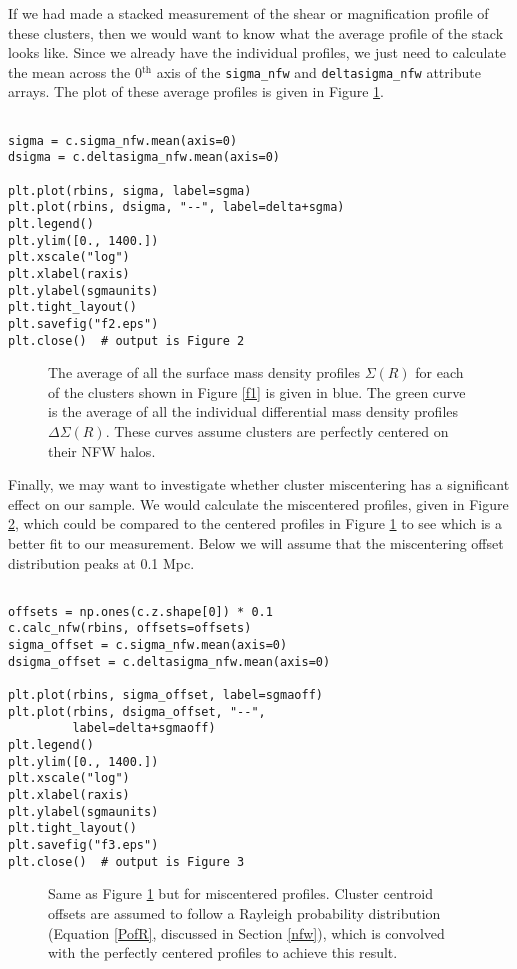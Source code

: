 \documentclass[twocolumn]{aastex6}
\newcommand{\code}{\lstinline[style=codeintext]}
\begin{document}
If we had made a stacked measurement of the shear or magnification profile of these clusters, then we would want to know what the average profile of the stack looks like. Since we already have the individual profiles, we just need to calculate the mean across the 0$^\mathrm{th}$ axis of the \code{sigma_nfw} and \code{deltasigma_nfw} attribute arrays. The plot of these average profiles is given in Figure \ref{f2}.

\begin{lstlisting}

sigma = c.sigma_nfw.mean(axis=0)
dsigma = c.deltasigma_nfw.mean(axis=0)

plt.plot(rbins, sigma, label=sgma)
plt.plot(rbins, dsigma, "--", label=delta+sgma)
plt.legend()
plt.ylim([0., 1400.])
plt.xscale("log")
plt.xlabel(raxis)
plt.ylabel(sgmaunits)
plt.tight_layout()
plt.savefig("f2.eps")
plt.close()  # output is Figure 2

\end{lstlisting}

\begin{figure}
\caption{The average of all the surface mass density profiles $\Sigma(R)$ for each of the clusters shown in Figure \ref{f1} is given in blue. The green curve is the average of all the individual differential mass density profiles $\Delta\Sigma(R)$. These curves assume clusters are perfectly centered on their NFW halos.}
\label{f2}
\end{figure}

Finally, we may want to investigate whether cluster miscentering has a significant effect on our sample. We would calculate the miscentered profiles, given in Figure \ref{f3}, which could be compared to the centered profiles in Figure \ref{f2} to see which is a better fit to our measurement. Below we will assume that the miscentering offset distribution peaks at 0.1 Mpc.

\begin{lstlisting}

offsets = np.ones(c.z.shape[0]) * 0.1
c.calc_nfw(rbins, offsets=offsets)
sigma_offset = c.sigma_nfw.mean(axis=0)
dsigma_offset = c.deltasigma_nfw.mean(axis=0)

plt.plot(rbins, sigma_offset, label=sgmaoff)
plt.plot(rbins, dsigma_offset, "--",
         label=delta+sgmaoff)
plt.legend()
plt.ylim([0., 1400.])
plt.xscale("log")
plt.xlabel(raxis)
plt.ylabel(sgmaunits)
plt.tight_layout()
plt.savefig("f3.eps")
plt.close()  # output is Figure 3

\end{lstlisting}
\begin{figure}
\caption{Same as Figure \ref{f2} but for miscentered profiles. Cluster centroid offsets are assumed to follow a Rayleigh probability distribution (Equation \ref{PofR}, discussed in Section \ref{nfw}), which is convolved with the perfectly centered profiles to achieve this result.}
\label{f3}
\end{figure}
\end{document}

